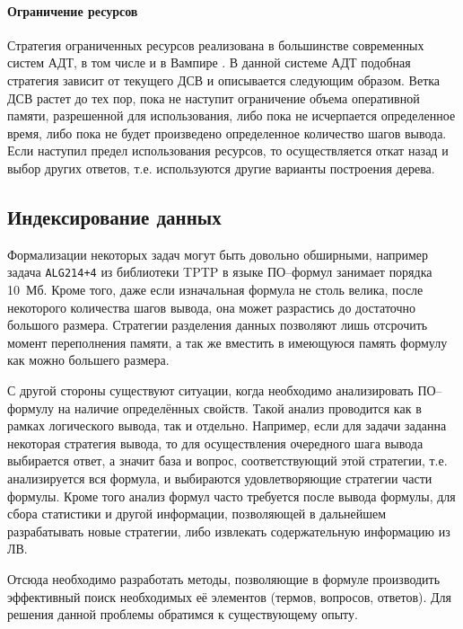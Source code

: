 \paragraph{Ограничение ресурсов} Стратегия ограниченных ресурсов реализована в большинстве современных систем АДТ, в том числе и в Вампире \cite{Ryazanov2003}. В данной системе АДТ подобная стратегия зависит от текущего ДСВ и описывается следующим образом. Ветка ДСВ растет до тех пор, пока не наступит ограничение объема оперативной памяти, разрешенной для использования, либо пока не исчерпается определенное время, либо пока не будет произведено определенное количество шагов вывода. Если наступил предел использования ресурсов, то осуществляется откат назад и выбор других ответов, т.е. используются другие варианты построения дерева.

\subsection{Индексирование данных}

Формализации некоторых задач могут быть довольно обширными, например задача \texttt{ALG214+4} из библиотеки TPTP в языке ПО--формул занимает порядка 10~Мб. Кроме того, даже если изначальная формула не столь велика, после некоторого количества шагов вывода, она может разрастись до достаточно большого размера. Стратегии разделения данных позволяют лишь отсрочить момент переполнения памяти, а так же вместить в имеющуюся память формулу как можно большего размера.

С другой стороны существуют ситуации, когда необходимо анализировать ПО--формулу на наличие определённых свойств. Такой анализ проводится как в рамках логического вывода, так и отдельно. Например, если для задачи заданна некоторая стратегия вывода, то для осуществления очередного шага вывода выбирается ответ, а значит база и вопрос, соответствующий этой стратегии, т.е. анализируется вся формула, и выбираются удовлетворяющие стратегии части формулы. Кроме того анализ формул часто требуется после вывода формулы, для сбора статистики и другой информации, позволяющей в дальнейшем разрабатывать новые стратегии, либо извлекать содержательную информацию из ЛВ.

Отсюда необходимо разработать методы, позволяющие в формуле производить эффективный поиск необходимых её элементов (термов, вопросов, ответов). Для решения данной проблемы обратимся к существующему опыту.

